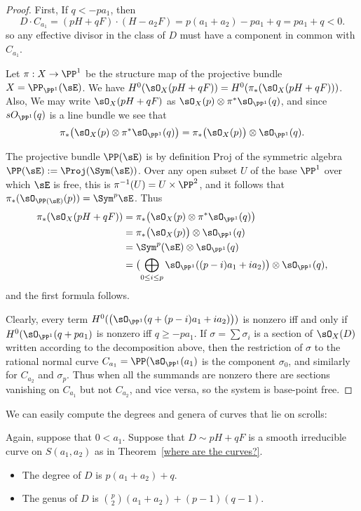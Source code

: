 \begin{proof} First, If $q<-pa_{1}$, then 
$$
D\cdot C_{a_{1}} = (pH+qF) \cdot (H-a_{2}F) = p(a_{1}+a_{2}) -pa_{1}+q = pa_{1}+q < 0.
$$
so any effective divisor in the class of $D$ must have a component in common with $C_{a_{1}}$.

Let $\pi:X\to \PP^{1}$ be the structure map of the projective bundle $X = \PP_{\PP^{1}}(\sE)$.
We have $H^{0}(\sO_{X}(pH+qF)) = H^{0}(\pi_{*}(\sO_{X}(pH+qF)))$. Also, 
We may write $\sO_{X}(pH+qF)$ as $\sO_{X}(p) \otimes \pi^{*}\sO_{\PP^{1}}(q)$, and since
$sO_{\PP^{1}}(q)$ is a line bundle we see that 
$$
\pi_{*}\bigl(\sO_{X}(p) \otimes \pi^{*}\sO_{\PP^{1}}(q)\bigr) 
 = \pi_{*}\bigl(\sO_{X}(p)\bigr)\otimes \sO_{\PP^{1}}(q).
$$

The projective bundle $\PP(\sE)$ is
by definition Proj of the symmetric algebra $\PP(\sE):=\Proj(\Sym(\sE))$. Over any open 
subset $U$ of the base $\PP^1$ over which $\sE$ is free, this is $\pi^{-1}(U) = U\times \PP^2$,
and it follows that $\pi_*(\sO_{\PP(\sE)}(p)) = \Sym^p\sE$. 
Thus 
\begin{align*}
\pi_{*}(\sO_{X}(pH+qF)) &= 
\pi_{*}\bigl(\sO_{X}(p) \otimes \pi^{*}\sO_{\PP^{1}}(q)\bigr) \\
 &= \pi_{*}\bigl(\sO_{X}(p)\bigr)\otimes \sO_{\PP^{1}}(q)\\
&=  \Sym^{p}(\sE)\otimes \sO_{\PP^{1}}(q)\\
&=  \bigl(\bigoplus_{0\leq i\leq p} \sO_{\PP^{1}}((p-i)a_{1}+i a_{2})\bigr) \otimes \sO_{\PP^{1}}(q),
\end{align*}
and the first formula follows. 

Clearly, every term 
$H^{0}(\bigl(\sO_{\PP^{1}}(q + (p-i)a_{1}+i a_{2})\bigr))$ is nonzero iff and only if 
$H^{0}(\sO_{\PP^{1}}(q + pa_{1})$ is nonzero iff $q\geq -pa_{1}$.
If $\sigma = \sum \sigma_i$ is a section of $\sO_X(D)$ written according to the decomposition
above, then the restriction of $\sigma$ to  the rational normal curve $C_{a_1} = \PP(\sO_{\PP^1}(a_1)$ is the component $\sigma_0$, and similarly for $C_{a_2}$ and $\sigma_p$. Thus when  all the summands are nonzero
there are sections  vanishing on $C_{a_{1}}$ but not $C_{a_{2}}$, and vice versa, so the system is base-point free. 
\end{proof}

 
We can easily compute the degrees and genera of curves that lie on scrolls:

\begin{proposition}Again, suppose that $0<a_{1}$.
 Suppose that $D\sim pH+qF$ is a smooth irreducible curve on $S(a_{1}, a_{2})$ as in Theorem~\ref{where are the curves?}. 
\begin{itemize}
 \item The degree of $D$ is $p(a_{1}+a_{2}) +q$.
 \item The genus of $D$ is ${p\choose 2}(a_{1}+a_{2}) + (p-1)(q-1)$.
\end{itemize}
\end{proposition}
  
